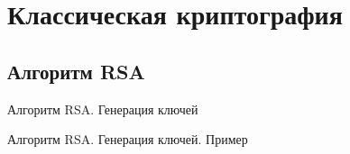 \section{Классическая криптография}
\subsection{Алгоритм RSA}
\begin{frame}{Алгоритм RSA. Генерация ключей}

\end{frame}
\begin{frame}{Алгоритм RSA. Генерация ключей. Пример}

\end{frame}
